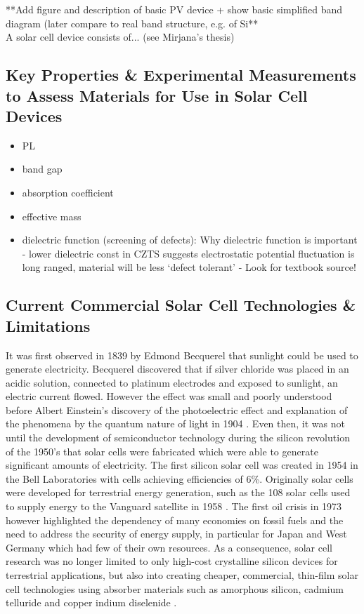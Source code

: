 **Add figure and description of basic PV device + show basic simplified band diagram (later compare to real band structure, e.g. of Si**\\

A solar cell device consists of... (see Mirjana's thesis)

\subsection{Key Properties \& Experimental Measurements to Assess Materials for Use in Solar Cell Devices}\label{PV_properties}
\begin{itemize}
\item PL
\item band gap
\item absorption coefficient
\item effective mass
\item dielectric function (screening of defects):   Why dielectric function is important - lower dielectric const in CZTS suggests electrostatic potential fluctuation is long ranged, material will be less `defect tolerant' - Look for textbook source!
\end{itemize}

\subsection{Current Commercial Solar Cell Technologies \& Limitations}
It was first observed in 1839 by Edmond Becquerel that sunlight could be used to generate electricity. Becquerel discovered that if  silver chloride was placed in an acidic solution, connected to platinum electrodes and exposed to sunlight, an electric current flowed. However the effect was small and poorly understood before Albert Einstein's discovery of the photoelectric effect and explanation of the phenomena by the quantum nature of light in 1904 \cite{PV_history1}. Even then, it was not until the development of semiconductor technology during the silicon revolution of the 1950's that solar cells were fabricated which were able to generate significant amounts of electricity. The first silicon solar cell was created in 1954 in the Bell Laboratories with cells achieving efficiencies of 6\%. 
Originally solar cells were developed for terrestrial energy generation, such as the 108 solar cells used to supply energy to the Vanguard satellite in 1958 \cite{PV_history1}. The first oil crisis in 1973 however highlighted the dependency of many economies on fossil fuels and the need to address the security of energy supply,  in particular for Japan and West Germany which had few of their own resources. As a consequence, solar cell research was no longer limited to only high-cost crystalline silicon devices for terrestrial applications, but also into creating cheaper, commercial, thin-film solar cell technologies using absorber materials such as amorphous silicon, cadmium telluride and copper indium diselenide  \cite{PV_history2}.\\

